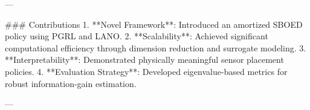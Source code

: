 ---

### Contributions
1. **Novel Framework**: Introduced an amortized SBOED policy using PGRL and LANO.
2. **Scalability**: Achieved significant computational efficiency through dimension reduction and surrogate modeling.
3. **Interpretability**: Demonstrated physically meaningful sensor placement policies.
4. **Evaluation Strategy**: Developed eigenvalue-based metrics for robust information-gain estimation.

---